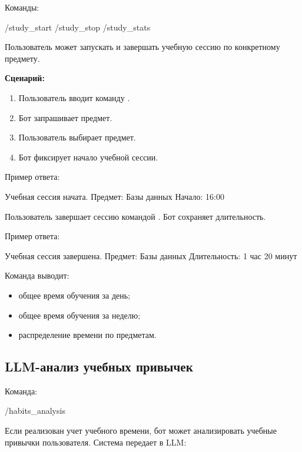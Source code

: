 \documentclass[10pt,a4paper,final]{article} %
\begin{document}
Команды:

\begin{Code}
/study_start
/study_stop
/study_stats
\end{Code}

Пользователь может запускать и завершать учебную сессию по конкретному предмету.

\textbf{Сценарий:}

\begin{enumerate}
    \item Пользователь вводит команду .
    \item Бот запрашивает предмет.
    \item Пользователь выбирает предмет.
    \item Бот фиксирует начало учебной сессии.
\end{enumerate}

Пример ответа:

\begin{Code}
Учебная сессия начата.
Предмет: Базы данных
Начало: 16:00
\end{Code}

Пользователь завершает сессию командой . Бот сохраняет длительность.

Пример ответа:

\begin{Code}
Учебная сессия завершена.
Предмет: Базы данных
Длительность: 1 час 20 минут
\end{Code}

Команда  выводит:

\begin{itemize}
    \item общее время обучения за день;
    \item общее время обучения за неделю;
    \item распределение времени по предметам.
\end{itemize}

\subsection{LLM-анализ учебных привычек}

Команда:

\begin{Code}
/habits_analysis
\end{Code}

Если реализован учет учебного времени, бот может анализировать учебные привычки пользователя. Система передает в LLM:
\end{document}
